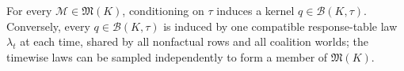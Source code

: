 For every \(\mathcal M\in\mathfrak M(K)\), conditioning on \(\tau\) induces a kernel \(q\in\mathcal B(K,\tau)\). Conversely, every \(q\in\mathcal B(K,\tau)\) is induced by one compatible response-table law \(\lambda_t\) at each time, shared by all nonfactual rows and all coalition worlds; the timewise laws can be sampled independently to form a member of \(\mathfrak M(K)\).